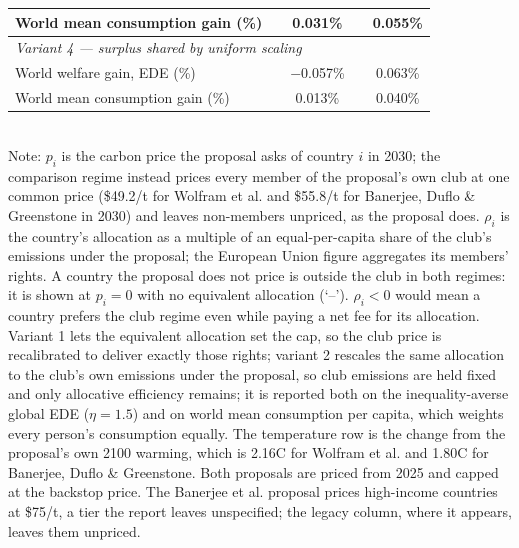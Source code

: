 \begin{table}[htbp]
\begin{tabular}{lcccc}
  \quad World mean consumption gain (\%) &  & 0.031\% &  & 0.055\% \\
  \midrule
  \multicolumn{5}{l}{\textit{Variant 4 --- surplus shared by uniform scaling}} \\
  \quad World welfare gain, EDE (\%) &  & $-$0.057\% &  & 0.063\% \\
  \quad World mean consumption gain (\%) &  & 0.013\% &  & 0.040\% \\
  \bottomrule
\end{tabular}
\label{tab:equiv_rights_B}
\\[4pt]
{\footnotesize Note: $p_i$ is the carbon price the proposal asks of country $i$ in 2030; the comparison regime instead prices every member of the proposal's own club at one common price (\$49.2/t for Wolfram et al. and \$55.8/t for Banerjee, Duflo \& Greenstone in 2030) and leaves non-members unpriced, as the proposal does. $\rho_i$ is the country's allocation as a multiple of an equal-per-capita share of the club's emissions under the proposal; the European Union figure aggregates its members' rights. A country the proposal does not price is outside the club in both regimes: it is shown at $p_i=0$ with no equivalent allocation (`--'). $\rho_i < 0$ would mean a country prefers the club regime even while paying a net fee for its allocation. Variant 1 lets the equivalent allocation set the cap, so the club price is recalibrated to deliver exactly those rights; variant 2 rescales the same allocation to the club's own emissions under the proposal, so club emissions are held fixed and only allocative efficiency remains; it is reported both on the inequality-averse global EDE ($\eta=1.5$) and on world mean consumption per capita, which weights every person's consumption equally. The temperature row is the change from the proposal's own 2100 warming, which is 2.16\textdegree{}C for Wolfram et al. and 1.80\textdegree{}C for Banerjee, Duflo \& Greenstone. Both proposals are priced from 2025 and capped at the backstop price. The Banerjee et al. proposal prices high-income countries at \$75/t, a tier the report leaves unspecified; the legacy column, where it appears, leaves them unpriced.}
\end{table}
